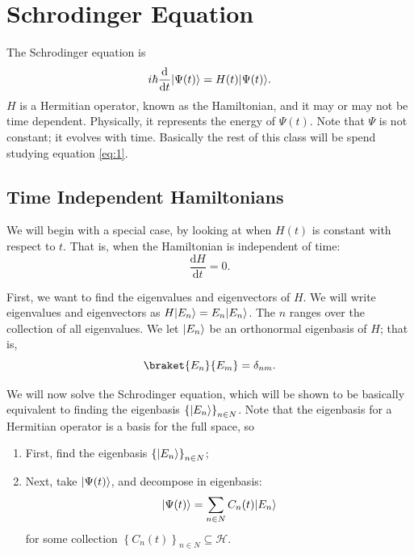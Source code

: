\chapter{Schrodinger Equation}
The Schrodinger equation is
\begin{equation}\label{eq:1}
	i \hbar \frac{\mathrm{d}}{\mathrm{d}t} \lvert\Psi (t)\rangle =H(t)\lvert\Psi (t)\rangle 
.\end{equation}
$H$ is a Hermitian operator, known as the Hamiltonian, and it may or may not be time dependent. Physically, it represents the energy of $\Psi (t)$. Note that $\Psi $ is not constant; it evolves with time. Basically the rest of this class will be spend studying equation \eqref{eq:1}.

\section{Time Independent Hamiltonians}
We will begin with a special case, by looking at when $H(t)$ is constant with respect to $t$. That is, when the Hamiltonian is independent of time:
\[
	\frac{\mathrm{d}H}{\mathrm{d}t} =0
.\]

First, we want to find the eigenvalues and eigenvectors of $H$. We will write eigenvalues and eigenvectors as $H\lvert E_n\rangle =E_n\lvert E_n\rangle $. The $n$ ranges over the collection of all eigenvalues. We let $\lvert E_n\rangle $ be an orthonormal eigenbasis of $H$; that is,
\[
	\braket{E_n}{E_m} =\delta_{nm} 
.\]

We will now solve the Schrodinger equation, which will be shown to be basically equivalent to finding the eigenbasis $\left\{ \lvert E_n\rangle  \right\}_{n\in N} $. Note that the eigenbasis for a Hermitian operator is a basis for the full space, so
\begin{enumerate}
	\item First, find the eigenbasis $\left\{ \lvert E_n\rangle  \right\}_{n\in N} $;
	\item Next, take $\lvert\Psi (t)\rangle $, and decompose in eigenbasis:
		\[
			\lvert\Psi (t)\rangle =\sum_{n\in N} C_n(t)\lvert E_n\rangle
		\]
		for some collection $\left\{ C_n(t) \right\}_{n\in N} \subseteq \mathcal{H} $.
\end{enumerate}

